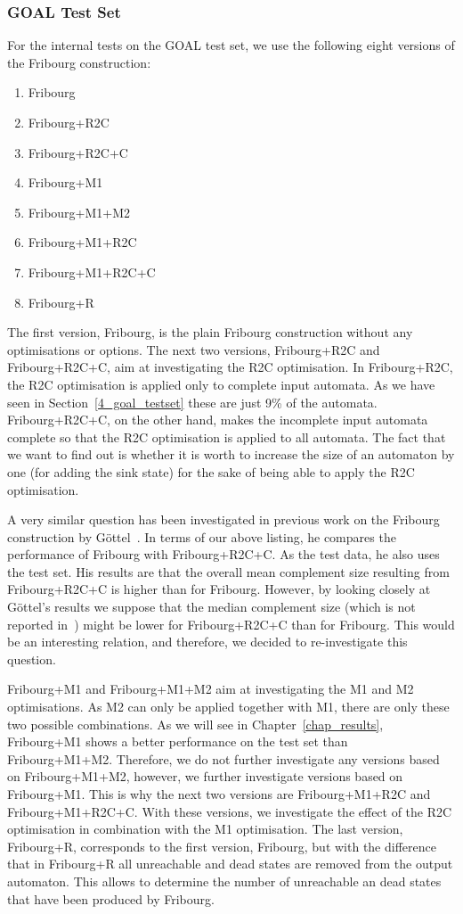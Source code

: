 \subsubsection{GOAL Test Set}
For the internal tests on the GOAL test set, we use the following eight versions of the Fribourg construction:
\begin{enumerate}
\item Fribourg
\item Fribourg+R2C
\item Fribourg+R2C+C
\item Fribourg+M1
\item Fribourg+M1+M2
\item Fribourg+M1+R2C
\item Fribourg+M1+R2C+C
\item Fribourg+R
\end{enumerate}

The first version, Fribourg, is the plain Fribourg construction without any optimisations or options. The next two versions, Fribourg+R2C and Fribourg+R2C+C, aim at investigating the R2C optimisation. In Fribourg+R2C, the R2C optimisation is applied only to complete input automata. As we have seen in Section~\ref{4_goal_testset} these are just 9\% of the automata. Fribourg+R2C+C, on the other hand, makes the incomplete input automata complete so that the R2C optimisation is applied to all automata. The fact that we want to find out is whether it is worth to increase the size of an automaton by one (for adding the sink state) for the sake of being able to apply the R2C optimisation.

A very similar question has been investigated in previous work on the Fribourg construction by Göttel~\cite{2013_bsc_goettel}. In terms of our above listing, he compares the performance of Fribourg with Fribourg+R2C+C. As the test data, he also uses the \goal{} test set. His results are that the overall mean complement size resulting from Fribourg+R2C+C is higher than for Fribourg. However, by looking closely at Göttel's results we suppose that the median complement size (which is not reported in~\cite{2013_bsc_goettel}) might be lower for Fribourg+R2C+C than for Fribourg. This would be an interesting relation, and therefore, we decided to re-investigate this question. 

Fribourg+M1 and Fribourg+M1+M2 aim at investigating the M1 and M2 optimisations. As M2 can only be applied together with M1, there are only these two possible combinations. As we will see in Chapter~\ref{chap_results}, Fribourg+M1 shows a better performance on the \goal{} test set than Fribourg+M1+M2. Therefore, we do not further investigate any versions based on Fribourg+M1+M2, however, we further investigate versions based on Fribourg+M1. This is why the next two versions are Fribourg+M1+R2C and Fribourg+M1+R2C+C. With these versions, we investigate the effect of the R2C optimisation in combination with the M1 optimisation. The last version, Fribourg+R, corresponds to the first version, Fribourg, but with the difference that in Fribourg+R all unreachable and dead states are removed from the output automaton. This allows to determine the number of unreachable an dead states that have been produced by Fribourg.

